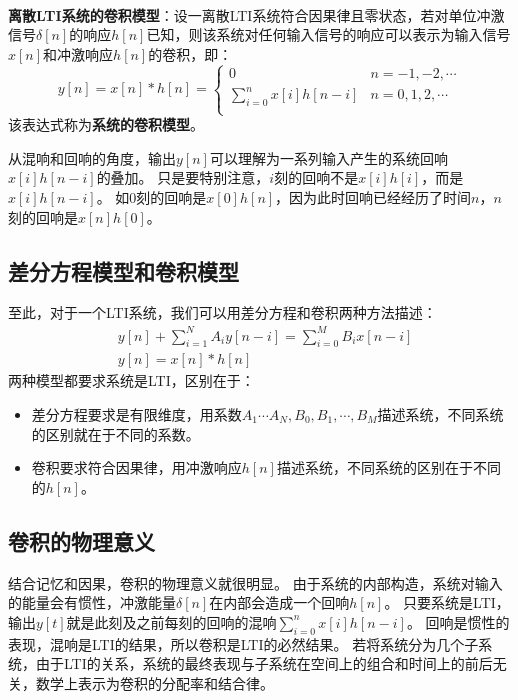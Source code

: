 ~

{\bf 离散LTI系统的卷积模型}：设一离散LTI系统符合因果律且零状态，若对单位冲激信号$\delta \left[ n \right] $的响应$h\left[ n \right] $已知，则该系统对任何输入信号的响应可以表示为输入信号$x\left[ n \right] $和冲激响应$h\left[ n \right] $的卷积，即：
\[
y\left[ n \right] =x\left[ n \right] \ast h\left[ n \right] =\begin{cases}
	0 &n=-1,-2,\cdots\\
	\sum_{i=0}^n{x\left[ i \right] h\left[ n-i \right]} &n=0,1,2,\cdots\\
\end{cases}
\]
该表达式称为{\bf 系统的卷积模型}。

从混响和回响的角度，输出$y\left[ n \right] $可以理解为一系列输入产生的系统回响$x\left[ i \right] h\left[ n-i \right] $的叠加。
只是要特别注意，$i$刻的回响不是$x\left[ i \right] h\left[ i \right] $，而是$x\left[ i \right] h\left[ n-i \right] $。
如0刻的回响是$x\left[ 0 \right] h\left[ n \right] $，因为此时回响已经经历了时间$n$，$n$刻的回响是$x\left[ n \right] h\left[ 0 \right] $。

\subsection{差分方程模型和卷积模型}

至此，对于一个LTI系统，我们可以用差分方程和卷积两种方法描述：
\begin{align*}
&y\left[ n \right] +\sum_{i=1}^N{A_iy\left[ n-i \right]}=\sum_{i=0}^M{B_ix\left[ n-i \right]} \\
&y\left[ n \right] =x\left[ n \right] \ast h\left[ n \right]
\end{align*}
两种模型都要求系统是LTI，区别在于：
\begin{itemize}
    \item 差分方程要求是有限维度，用系数$A_1\cdots A_N,B_0,B_1,\cdots ,B_M$描述系统，不同系统的区别就在于不同的系数。
    \item 卷积要求符合因果律，用冲激响应$h\left[ n \right] $描述系统，不同系统的区别在于不同的$h\left[ n \right] $。
\end{itemize}

\subsection{卷积的物理意义}

结合记忆和因果，卷积的物理意义就很明显。
由于系统的内部构造，系统对输入的能量会有惯性，冲激能量$\delta \left[ n \right] $在内部会造成一个回响$h\left[ n \right] $。
只要系统是LTI，输出$y \left[ t \right]$就是此刻及之前每刻的回响的混响$\sum_{i=0}^n{x\left[ i \right] h\left[ n-i \right]}$。
回响是惯性的表现，混响是LTI的结果，所以卷积是LTI的必然结果。
若将系统分为几个子系统，由于LTI的关系，系统的最终表现与子系统在空间上的组合和时间上的前后无关，数学上表示为卷积的分配率和结合律。

